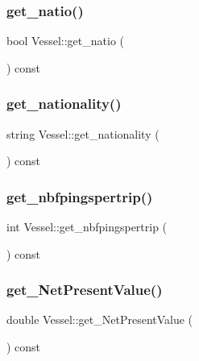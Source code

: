 \mbox{\label{class_vessel_a398d5d7742214cab8284d00fa429e1de}} 
\subsubsection{\texorpdfstring{get\_natio()}{get\_natio()}}
{\footnotesize\ttfamily bool Vessel\+::get\+\_\+natio (\begin{DoxyParamCaption}{ }\end{DoxyParamCaption}) const}

\mbox{\label{class_vessel_ac28c8be120c62bd02c69967c8b6f9eda}} 
\subsubsection{\texorpdfstring{get\_nationality()}{get\_nationality()}}
{\footnotesize\ttfamily string Vessel\+::get\+\_\+nationality (\begin{DoxyParamCaption}{ }\end{DoxyParamCaption}) const}

\mbox{\label{class_vessel_ac6fc5966232c30face95d8f7a5fbd9c5}} 
\subsubsection{\texorpdfstring{get\_nbfpingspertrip()}{get\_nbfpingspertrip()}}
{\footnotesize\ttfamily int Vessel\+::get\+\_\+nbfpingspertrip (\begin{DoxyParamCaption}{ }\end{DoxyParamCaption}) const}

\mbox{\label{class_vessel_af69f57aa1be4a204b4da4082cc3425a7}} 
\subsubsection{\texorpdfstring{get\_NetPresentValue()}{get\_NetPresentValue()}}
{\footnotesize\ttfamily double Vessel\+::get\+\_\+\+Net\+Present\+Value (\begin{DoxyParamCaption}{ }\end{DoxyParamCaption}) const}

